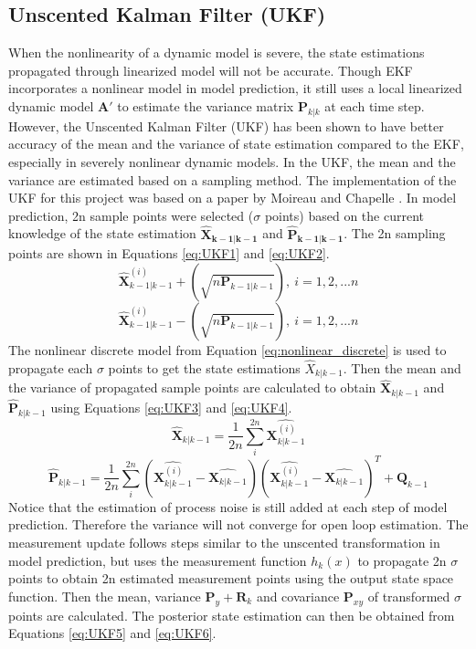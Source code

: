 \documentclass{article}
\newcommand{\matr}[1]{\bm{#1}}     %
\begin{document}
\subsection{Unscented Kalman Filter (UKF)}
When the nonlinearity of a dynamic model is severe, the state estimations propagated through linearized model will not be accurate. Though EKF incorporates a nonlinear model in model prediction, it still uses a local linearized dynamic model ${\matr{A}'}$ to estimate the variance matrix $\matr{P}_{k|k}$ at each time step. However, the Unscented Kalman Filter (UKF) has been shown to have better accuracy of the mean and the variance of state estimation compared to the EKF, especially in severely nonlinear dynamic models. In the UKF, the mean and the variance are estimated based on a sampling method. The implementation of the UKF for this project was based on a paper by Moireau and Chapelle \cite{moireau2011reduced}. In model prediction, 2n sample points were selected ($\sigma$ points) based on the current knowledge of the state estimation $\matr{\hat{X}_{k-1|k-1}}$ and $\matr{\hat{P}_{k-1|k-1}}$. The 2n sampling points are shown in Equations \ref{eq:UKF1} and \ref{eq:UKF2}.
\begin{equation}
	\hat{\matr{X}}^{(i)}_{k-1|k-1}+(\sqrt{n\matr{P}_{k-1|k-1}}),\  i=1,2,...n
\label{eq:UKF1}
\end{equation}
\begin{equation}
 \hat{\matr{X}}^{(i)}_{k-1|k-1}-(\sqrt{n\matr{P}_{k-1|k-1}}),\  i=1,2,...n
\label{eq:UKF2}
\end{equation}
The nonlinear discrete model from Equation \ref{eq:nonlinear_discrete} is used to propagate each $\sigma$ points to get the state estimations $\hat{X}_{k|k-1}$. Then the mean and the variance of propagated sample points are calculated to obtain $\hat{\matr{X}}_{k|k-1}$ and $\hat{\matr{P}}_{k|k-1}$ using Equations \ref{eq:UKF3} and \ref{eq:UKF4}.
\begin{equation}
 \hat{\matr{X}}_{k|k-1}=\frac{1}{2n}\sum_{i}^{2n}\hat{\matr{X}^{(i)}_{k|k-1}}
\label{eq:UKF3}
\end{equation}
\begin{equation}
\hat{\matr{P}}_{k|k-1}=\frac{1}{2n}\sum_{i}^{2n}(\hat{\matr{X}^{(i)}_{k|k-1}}-\hat{\matr{X}_{k|k-1}})(\hat{\matr{X}^{(i)}_{k|k-1}}-\hat{\matr{X}_{k|k-1}})^T + \matr{Q}_{k-1}
\label{eq:UKF4}
\end{equation}
Notice that the estimation of process noise is still added at each step of model prediction. Therefore the variance will not converge for open loop estimation. The measurement update follows steps similar to the unscented transformation in model prediction, but uses the measurement function $h_k(x)$ to propagate 2n $\sigma$ points to obtain 2n estimated measurement points using the output state space function. Then the mean, variance $\matr{P}_y+\matr{R}_k$ and covariance $\matr{P}_{xy}$ of transformed $\sigma$ points are calculated.  The posterior state estimation can then be obtained from Equations \ref{eq:UKF5} and \ref{eq:UKF6}.
\end{document}
